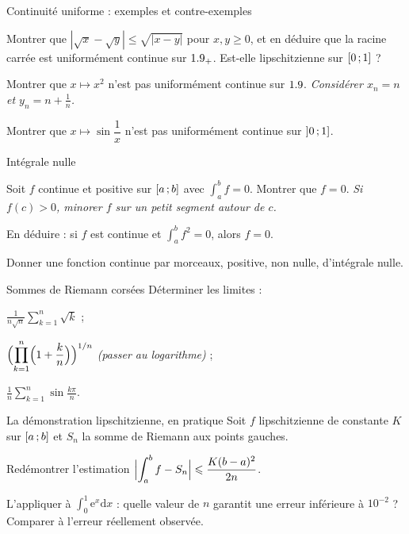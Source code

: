 
\begin{exercice}[2]{Continuité uniforme : exemples et contre-exemples}
\begin{questions}
  \item Montrer que $|\sqrt x-\sqrt y|\leqslant\sqrt{|x-y|}$ pour
    $x,y\geqslant0$, et en déduire que la racine carrée est uniformément
    continue sur $1.9_{+}$. Est-elle lipschitzienne sur $\mathopen{[}0\,{;}\,1\mathclose{]}$ ?
  \item Montrer que $x\mapsto x^{2}$ n'est pas uniformément continue sur
    $1.9$. \emph{Considérer $x_n=n$ et $y_n=n+\frac1n$.}
  \item Montrer que $x\mapsto\sin\dfrac1x$ n'est pas uniformément continue
    sur $\mathopen{]}0\,{;}\,1\mathclose{]}$.
\end{questions}
\end{exercice}

\begin{exercice}[2]{Intégrale nulle}
\begin{questions}
  \item Soit $f$ continue et positive sur $\mathopen{[}a\,{;}\,b\mathclose{]}$ avec
    $\displaystyle\int_{a}^{b}f=0$. Montrer que $f=0$.
    \emph{Si $f(c)>0$, minorer $f$ sur un petit segment autour de $c$.}
  \item En déduire : si $f$ est continue et
    $\displaystyle\int_{a}^{b}f^{2}=0$, alors $f=0$.
  \item Donner une fonction continue par morceaux, positive, non nulle,
    d'intégrale nulle.
\end{questions}
\end{exercice}

\begin{exercice}[2]{Sommes de Riemann corsées}
Déterminer les limites :
\begin{questions}
  \item $\displaystyle\frac{1}{n\sqrt n}\sum_{k=1}^{n}\sqrt{k}$ ;
  \item $\displaystyle\Bigl(\prod_{k=1}^{n}\Bigl(1+\frac kn\Bigr)\Bigr)^{1/n}$
    \emph{(passer au logarithme)} ;
  \item $\displaystyle\frac1n\sum_{k=1}^{n}\sin\frac{k\pi}{n}$.
\end{questions}
\end{exercice}

\begin{exercice}[2]{La démonstration lipschitzienne, en pratique}
Soit $f$ lipschitzienne de constante $K$ sur $\mathopen{[}a\,{;}\,b\mathclose{]}$ et $S_n$ la
somme de Riemann aux points gauches.
\begin{questions}
  \item Redémontrer l'estimation
    $\Bigl|\displaystyle\int_{a}^{b}f-S_n\Bigr|
    \leqslant\dfrac{K(b-a)^{2}}{2n}$.
  \item L'appliquer à $\displaystyle\int_{0}^{1}\mathrm{e}^{x}\mathrm{d}x$ :
    quelle valeur de $n$ garantit une erreur inférieure à $10^{-2}$ ?
    Comparer à l'erreur réellement observée.
\end{questions}
\end{exercice}


